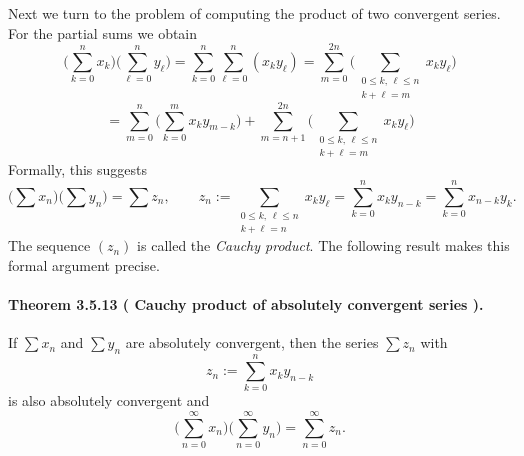 \documentclass[12pt,a4paper]{article}
\newcommand{\NumberedTheorem}[3]{%
\paragraph*{Theorem #1 ( #2 ).} #3\par}
\theoremstyle{plain}
\theoremstyle{definition}
\theoremstyle{remark}
\begin{document}
	Next we turn to the problem of computing the product of two convergent series. For the partial sums we obtain
	\[
		\Bigg( \sum_{k=0}^{n} x_k \Bigg) \Bigg( \sum_{\ell=0}^{n} y_\ell \Bigg)
			= \sum_{k=0}^{n} \sum_{\ell=0}^{n} (x_k y_\ell)
			= \sum_{m=0}^{2n} \Bigg( \sum_{\substack{0\le k,\,\ell\le n\\ k+\ell = m}} x_k y_\ell \Bigg)
	\]
	\[
			= \sum_{m=0}^{n} \Bigg( \sum_{k=0}^{m} x_k y_{m-k} \Bigg)
				+ \sum_{m=n+1}^{2n} \Bigg( \sum_{\substack{0\le k,\,\ell\le n\\ k+\ell = m}} x_k y_\ell \Bigg) \tag{$\ast$}
	\]
	Formally, this suggests
	\[
		\Big( \sum x_n \Big) \Big( \sum y_n \Big) = \sum z_n, \qquad
		z_n := \sum_{\substack{0\le k,\,\ell\le n\\ k+\ell = n}} x_k y_\ell = \sum_{k=0}^{n} x_k y_{n-k} = \sum_{k=0}^{n} x_{n-k} y_k.
	\]
	The sequence $(z_n)$ is called the \emph{Cauchy product}. The following result makes this formal argument precise.

	\NumberedTheorem{3.5.13}{Cauchy product of absolutely convergent series}{If $\sum x_n$ and $\sum y_n$ are absolutely convergent, then the series $\sum z_n$ with
	\[
		z_n := \sum_{k=0}^{n} x_k y_{n-k}
	\]
	is also absolutely convergent and
	\[
		\Big( \sum_{n=0}^{\infty} x_n \Big) \Big( \sum_{n=0}^{\infty} y_n \Big) = \sum_{n=0}^{\infty} z_n.
	\]
}
\end{document}
